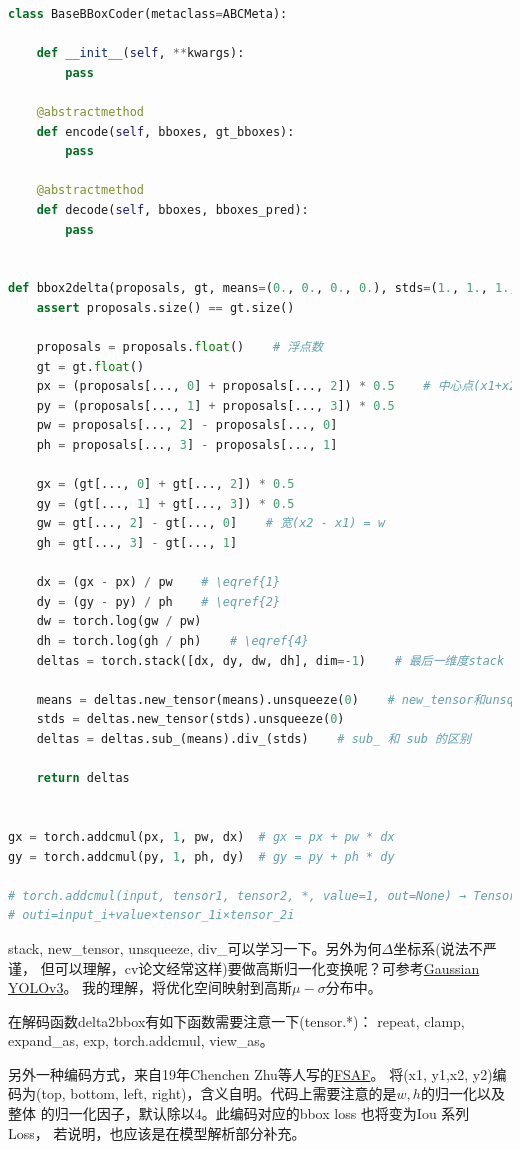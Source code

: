 \documentclass[UTF8]{ctexart}
\begin{document}
\lstset{style=mystyle}
\begin{lstlisting}[language=Python]
class BaseBBoxCoder(metaclass=ABCMeta):

	def __init__(self, **kwargs):
		pass

	@abstractmethod
	def encode(self, bboxes, gt_bboxes):
		pass

	@abstractmethod
	def decode(self, bboxes, bboxes_pred):
		pass


def bbox2delta(proposals, gt, means=(0., 0., 0., 0.), stds=(1., 1., 1., 1.)):
	assert proposals.size() == gt.size()

	proposals = proposals.float()    # 浮点数
	gt = gt.float()
	px = (proposals[..., 0] + proposals[..., 2]) * 0.5    # 中心点(x1+x2)/2
	py = (proposals[..., 1] + proposals[..., 3]) * 0.5 
	pw = proposals[..., 2] - proposals[..., 0]    
	ph = proposals[..., 3] - proposals[..., 1]

	gx = (gt[..., 0] + gt[..., 2]) * 0.5    
	gy = (gt[..., 1] + gt[..., 3]) * 0.5
	gw = gt[..., 2] - gt[..., 0]    # 宽(x2 - x1) = w
	gh = gt[..., 3] - gt[..., 1]

	dx = (gx - px) / pw    # \eqref{1}
	dy = (gy - py) / ph    # \eqref{2}
	dw = torch.log(gw / pw)
	dh = torch.log(gh / ph)    # \eqref{4}
	deltas = torch.stack([dx, dy, dw, dh], dim=-1)    # 最后一维度stack

	means = deltas.new_tensor(means).unsqueeze(0)    # new_tensor和unsqueeze(扩张维度)
	stds = deltas.new_tensor(stds).unsqueeze(0)
	deltas = deltas.sub_(means).div_(stds)    # sub_ 和 sub 的区别

	return deltas


gx = torch.addcmul(px, 1, pw, dx)  # gx = px + pw * dx
gy = torch.addcmul(py, 1, ph, dy)  # gy = py + ph * dy

# torch.addcmul(input, tensor1, tensor2, *, value=1, out=None) → Tensor
# outi​=input_i​+value×tensor_1i​×tensor_2i​
\end{lstlisting}

stack, new\_tensor, unsqueeze, div\_可以学习一下。另外为何$\Delta$坐标系(说法不严谨，
但可以理解，cv论文经常这样)要做高斯归一化变换呢？可参考\href{https://arxiv.org/abs/1904.04620}{Gaussian YOLOv3}。
我的理解，将优化空间映射到高斯$\mu-\sigma$分布中。

在解码函数delta2bbox有如下函数需要注意一下(tensor.*)：
repeat, clamp, expand\_as, exp, torch.addcmul, view\_as。

另外一种编码方式，来自19年Chenchen Zhu等人写的\href{https://arxiv.org/abs/1903.00621}{FSAF}。
将(x1, y1,x2, y2)编码为(top, bottom, left, right)，含义自明。代码上需要注意的是$w, h$的归一化以及整体
的归一化因子，默认除以4。此编码对应的bbox loss 也将变为Iou 系列 Loss， 若说明，也应该是在模型解析部分补充。
\end{document}
